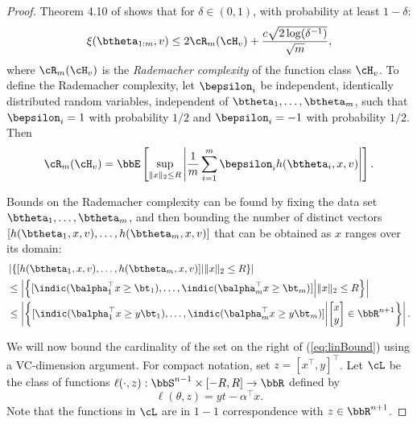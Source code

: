 \documentclass[letterpaper, 10 pt, conference]{ieeeconf}  %
\begin{document}
\begin{proof}
  Theorem 4.10 of \cite{wainwright2019high} shows that for $\delta \in (0,1)$, with probability at least $1-\delta$:
  \begin{equation}
    \label{eq:rademacherToEmpMean}
    \xi(\btheta_{1:m},v)
    \le 2\cR_m(\cH_v)+\frac{c\sqrt{2\log(\delta^{-1})}}{\sqrt{m}},
  \end{equation}
  where $\cR_m(\cH_v)$ is the \emph{Rademacher complexity} of the function class $\cH_v$. To define the Rademacher complexity, let $\bepsilon_i$ be independent, identically distributed random variables, independent of $\btheta_1,\ldots,\btheta_m$, such that $\bepsilon_i=1$ with probability $1/2$ and $\bepsilon_i=-1$ with probability $1/2$. Then
  $$
  \cR_m(\cH_v)=\bbE\left[\sup_{\|x\|_2\le R}\left|\frac{1}{m}\sum_{i=1}^m \bepsilon_i h(\btheta_i,x,v)\right|\right].
  $$

  Bounds on the Rademacher complexity can be found by fixing the data set $\btheta_1,\ldots,\btheta_m$, and then bounding the number of distinct vectors $[h(\btheta_1,x,v),\ldots,h(\btheta_m,x,v)]$ that can be obtained as $x$ ranges over its  domain:
  \begin{align}
    \nonumber
    \MoveEqLeft[0]
    \left|\left\{[h(\btheta_1,x,v),\ldots,h(\btheta_m,x,v)] \middle| \|x\|_2\le R\right\} \right| \\
    \nonumber
    &\le \left|\left\{[\indic(\balpha_1^\top x \ge \bt_1),\ldots, \indic(\balpha_m^\top x\ge \bt_m)] \middle| \|x\|_2\le R \right\} \right| \\
    \label{eq:linBound}
    &\le 
      \left|\left\{[\indic(\balpha_1^\top x \ge y\bt_1),\ldots, \indic(\balpha_m^\top x\ge y\bt_m)] \middle| \begin{bmatrix}x\\ y\end{bmatrix}\in\bbR^{n+1} \right\} \right|.
  \end{align}


  We will now bound the cardinality of the set on the right of (\ref{eq:linBound}) using a VC-dimension argument. For compact notation, set $z=[x^\top, y]^\top$. 
  Let $\cL$ be the class of functions $\ell(\cdot,z):\bbS^{n-1}\times [-R,R]\to \bbR$ defined by
  $$
  \ell(\theta,z)=yt-\alpha^\top x.
  $$
  Note that the functions in $\cL$ are in $1-1$ correspondence with $z\in\bbR^{n+1}$. 
  

\end{proof}
\end{document}
